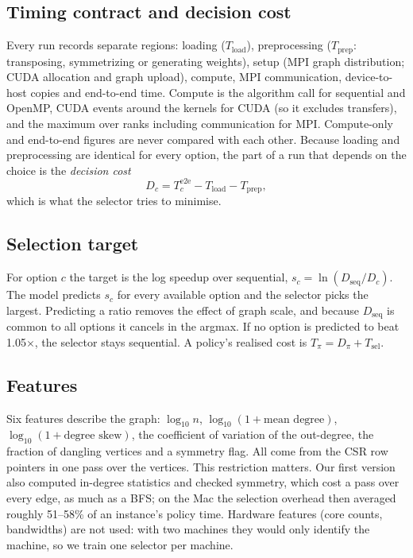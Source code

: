 \documentclass[conference]{IEEEtran}
\begin{document}
\subsection{Timing contract and decision cost}
Every run records separate regions: loading ($T_{\text{load}}$), preprocessing ($T_{\text{prep}}$: transposing, symmetrizing or generating weights), setup (MPI graph distribution; CUDA allocation and graph upload), compute, MPI communication, device-to-host copies and end-to-end time. Compute is the algorithm call for sequential and OpenMP, CUDA events around the kernels for CUDA (so it excludes transfers), and the maximum over ranks including communication for MPI. Compute-only and end-to-end figures are never compared with each other. Because loading and preprocessing are identical for every option, the part of a run that depends on the choice is the \emph{decision cost}
\begin{equation}
D_c = T^{\text{e2e}}_c - T_{\text{load}} - T_{\text{prep}},\label{eq:dc}
\end{equation}
which is what the selector tries to minimise.

\subsection{Selection target}
For option $c$ the target is the log speedup over sequential, $s_c=\ln(D_{\text{seq}}/D_c)$. The model predicts $s_c$ for every available option and the selector picks the largest. Predicting a ratio removes the effect of graph scale, and because $D_{\text{seq}}$ is common to all options it cancels in the argmax. If no option is predicted to beat 1.05$\times$, the selector stays sequential. A policy's realised cost is $T_\pi = D_{\pi}+T_{\text{sel}}$.

\subsection{Features}
Six features describe the graph: $\log_{10}n$, $\log_{10}(1+\text{mean degree})$, $\log_{10}(1+\text{degree skew})$, the coefficient of variation of the out-degree, the fraction of dangling vertices and a symmetry flag. All come from the CSR row pointers in one pass over the vertices. This restriction matters. Our first version also computed in-degree statistics and checked symmetry, which cost a pass over every edge, as much as a BFS; on the Mac the selection overhead then averaged roughly 51--58\% of an instance's policy time. Hardware features (core counts, bandwidths) are not used: with two machines they would only identify the machine, so we train one selector per machine.
\end{document}
